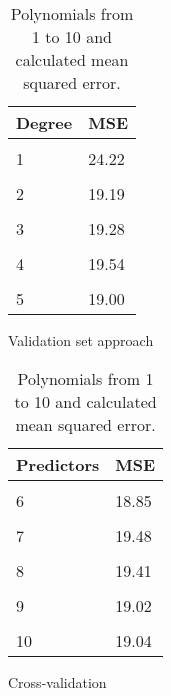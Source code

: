 \begin{table}	
	\centering
	\begin{subtable}[t]{2in}
		\centering
		\begin{tabular}{ p{2.5cm} p{1.5cm}  }
			\textbf{Degree} & \textbf{MSE} \\
			\hline 
			\\
			1 & 24.22 \\\hline
			\\
			2 & 19.19 \\\hline
			\\
			3 & 19.28 \\\hline
			\\
			4 & 19.54  \\\hline
			\\
			5 & 19.00  \\\hline
		\end{tabular}
		\caption{Validation set approach}\label{table:mse_validation}
	\end{subtable}
	\quad 
	\begin{subtable}[t]{2in}
		\centering
		\begin{tabular}{ p{2.5cm} p{1.5cm}  }
			\textbf{Predictors} & \textbf{MSE} \\
			\hline 
			\\
			6 & 18.85 \\\hline
			\\
			7 & 19.48  \\\hline
			\\
			8 & 19.41  \\\hline
			\\
			9 & 19.02  \\\hline
			\\
			10 & 19.04  \\\hline
		\end{tabular}
		\caption{Cross-validation}\label{table:mse_cross}
	\end{subtable}
	\caption{Polynomials from 1 to 10 and calculated mean squared error.}\label{table:kfold_polynomials_mse}
\end{table}

